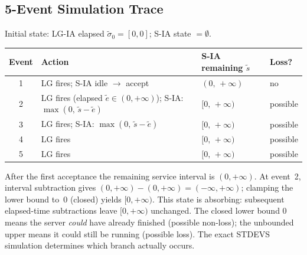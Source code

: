 \subsection*{5-Event Simulation Trace}

Initial state: LG-IA elapsed $\tilde\sigma_0 = [0,0]$; S-IA state $= \emptyset$.

\begin{center}
\footnotesize
\begin{tabular}{@{}clll@{}}
\toprule
Event & Action & S-IA remaining $\tilde s$ & Loss? \\
\midrule
1 & LG fires; S-IA idle $\to$ accept & $(0,\,+\infty)$ & no \\
2 & LG fires (elapsed $\tilde e \in (0,+\infty)$);
    S-IA: $\max(0,\,\tilde s - \tilde e)$
  & $[0,\,+\infty)$ & possible \\
3 & LG fires; S-IA: $\max(0,\,\tilde s - \tilde e)$
  & $[0,\,+\infty)$ & possible \\
4 & LG fires & $[0,\,+\infty)$ & possible \\
5 & LG fires & $[0,\,+\infty)$ & possible \\
\bottomrule
\end{tabular}
\end{center}

After the first acceptance the remaining service interval is $(0,+\infty)$.
At event~2, interval subtraction gives
$(0,+\infty) - (0,+\infty) = (-\infty,+\infty)$; clamping the lower bound
to~$0$ (closed) yields $[0,+\infty)$.  This state is absorbing: subsequent
elapsed-time subtractions leave $[0,+\infty)$ unchanged.  The closed
lower bound $0$ means the server \emph{could} have already finished
(possible non-loss); the unbounded upper means it could still be running
(possible loss).  The exact STDEVS simulation determines which branch
actually occurs.

